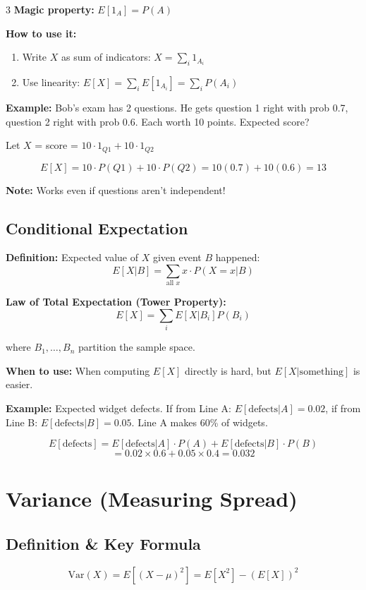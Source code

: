 \documentclass[10pt,landscape]{article}
\begin{document}
\begin{multicols}{3}
\textbf{Magic property:} $E[1_A] = P(A)$

\textbf{How to use it:}
\begin{enumerate}[leftmargin=*,noitemsep,topsep=0pt]
\item Write $X$ as sum of indicators: $X = \sum_i 1_{A_i}$
\item Use linearity: $E[X] = \sum_i E[1_{A_i}] = \sum_i P(A_i)$
\end{enumerate}

\textbf{Example:} Bob's exam has 2 questions. He gets question 1 right with prob 0.7, question 2 right with prob 0.6. Each worth 10 points. Expected score?

Let $X$ = score = $10 \cdot 1_{Q1} + 10 \cdot 1_{Q2}$

$$E[X] = 10 \cdot P(Q1) + 10 \cdot P(Q2) = 10(0.7) + 10(0.6) = 13$$

\textbf{Note:} Works even if questions aren't independent!

\subsection{Conditional Expectation}
\textbf{Definition:} Expected value of $X$ given event $B$ happened:
$$E[X | B] = \sum_{\text{all } x} x \cdot P(X = x | B)$$

\textbf{Law of Total Expectation (Tower Property):}
$$E[X] = \sum_i E[X | B_i] P(B_i)$$

where $B_1, \ldots, B_n$ partition the sample space.

\textbf{When to use:} When computing $E[X]$ directly is hard, but $E[X | \text{something}]$ is easier.

\textbf{Example:} Expected widget defects. If from Line A: $E[\text{defects}|A] = 0.02$, if from Line B: $E[\text{defects}|B] = 0.05$. Line A makes 60\% of widgets.

$$E[\text{defects}] = E[\text{defects}|A] \cdot P(A) + E[\text{defects}|B] \cdot P(B)$$
$$= 0.02 \times 0.6 + 0.05 \times 0.4 = 0.032$$

\section{Variance (Measuring Spread)}

\subsection{Definition \& Key Formula}
$$\text{Var}(X) = E[(X - \mu)^2] = E[X^2] - (E[X])^2$$


\end{multicols}
\end{document}
